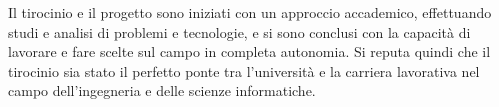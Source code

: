 Il tirocinio e il progetto sono iniziati con un approccio accademico, effettuando studi e analisi di problemi e tecnologie, e si sono conclusi con la capacità di lavorare e fare scelte sul campo in completa autonomia.
Si reputa quindi che il tirocinio sia stato il perfetto ponte tra l'università e la carriera lavorativa nel campo dell'ingegneria e delle scienze informatiche.